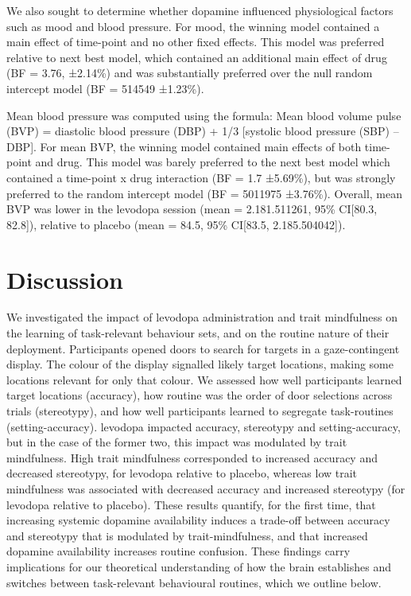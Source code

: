 \documentclass[
  man]{apa6}
\begin{document}
We also sought to determine whether dopamine influenced physiological factors such as mood and blood pressure. For mood, the winning model contained a main effect of time-point and no other fixed effects. This model was preferred relative to next best model, which contained an additional main effect of drug (BF = 3.76, ±2.14\%) and was substantially preferred over the null random intercept model (BF = 514549 ±1.23\%).

Mean blood pressure was computed using the formula: Mean blood volume pulse (BVP) = diastolic blood pressure (DBP) + 1/3 {[}systolic blood pressure (SBP) -- DBP{]}. For mean BVP, the winning model contained main effects of both time-point and drug. This model was barely preferred to the next best model which contained a time-point x drug interaction (BF = 1.7 ±5.69\%), but was strongly preferred to the random intercept model (BF = 5011975 ±3.76\%). Overall, mean BVP was lower in the levodopa session (mean = 2.181.511261, 95\% CI{[}80.3, 82.8{]}), relative to placebo (mean = 84.5, 95\% CI{[}83.5, 2.185.504042{]}).

\hypertarget{discussion}{%
\section{Discussion}\label{discussion}}

\label{sec:Discussion}

We investigated the impact of levodopa administration and trait mindfulness on the learning of task-relevant behaviour sets, and on the routine nature of their deployment. Participants opened doors to search for targets in a gaze-contingent display. The colour of the display signalled likely target locations, making some locations relevant for only that colour. We assessed how well participants learned target locations (accuracy), how routine was the order of door selections across trials (stereotypy), and how well participants learned to segregate task-routines (setting-accuracy). levodopa impacted accuracy, stereotypy and setting-accuracy, but in the case of the former two, this impact was modulated by trait mindfulness. High trait mindfulness corresponded to increased accuracy and decreased stereotypy, for levodopa relative to placebo, whereas low trait mindfulness was associated with decreased accuracy and increased stereotypy (for levodopa relative to placebo). These results quantify, for the first time, that increasing systemic dopamine availability induces a trade-off between accuracy and stereotypy that is modulated by trait-mindfulness, and that increased dopamine availability increases routine confusion. These findings carry implications for our theoretical understanding of how the brain establishes and switches between task-relevant behavioural routines, which we outline below.
\end{document}
